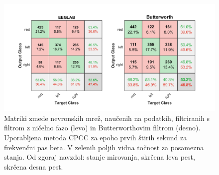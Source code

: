 \begin{figure}
    \begin{center}
    \includegraphics[width=1\linewidth]{slike/ComparisonFilters2.png}
    \end{center}
    \caption[Matriki zmede nevronskih mrež za frekvenčno območje beta.]{Matriki zmede nevronskih mrež, naučenih na podatkih, filtriranih s filtrom z ničelno fazo (levo) in Butterworthovim filtrom (desno). Uporabljena metoda CPCC za epoho prvih štirih sekund za frekvenčni pas beta. V zelenih poljih vidna točnost za posamezna stanja. Od zgoraj navzdol: stanje mirovanja, skrčena leva pest, skrčena desna pest.}
    \label{slika:filter_matrika}
    \end{figure}

